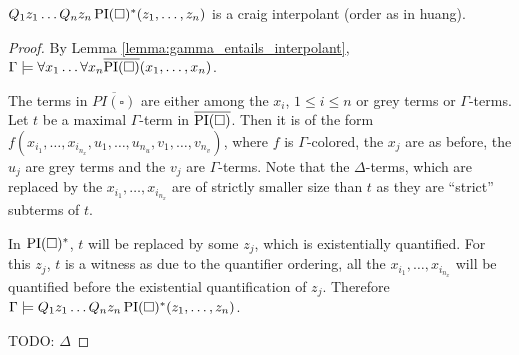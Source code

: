 \begin{thm}
	$Q_1 z_1 \ldots Q_n z_n \operatorname{PI}(\square)^*(z_1, \ldots, z_n)$ is a craig interpolant (order as in huang).
\end{thm}
\begin{proof}
	By Lemma \ref{lemma:gamma_entails_interpolant}, $\Gamma \models \forall x_1 \ldots \forall x_n \overline{\operatorname{PI}(\square)}(x_1, \ldots, x_n)$.

	The terms in $\overline{PI(\square)}$ are either among the $x_i$, $1 \leq i \leq n$ or grey terms or $\Gamma$-terms.
	Let $t$ be a maximal $\Gamma$-term in $\overline{\operatorname{PI}(\square)}$.
	Then it is of the form $f(x_{i_1}, \ldots, x_{i_{n_x}}, u_1, \ldots, u_{n_u}, v_1, \ldots, v_{n_v})$, where $f$ is $\Gamma$-colored, the $x_j$ are as before, the $u_j$ are grey terms and the $v_j$ are $\Gamma$-terms.
	Note that the $\Delta$-terms, which are replaced by the $x_{i_1}, \ldots, x_{i_{n_x}}$ are of strictly smaller size than $t$ as they are ``strict'' subterms of $t$.

	In $\operatorname{PI}(\square)^*$, $t$ will be replaced by some $z_j$, which is existentially quantified.
	For this $z_j$, $t$ is a witness as due to the quantifier ordering, all the $x_{i_1}, \ldots, x_{i_{n_x}}$ will be quantified before the existential quantification of $z_j$.
	Therefore $\Gamma \models Q_1 z_1 \ldots Q_n z_n \operatorname{PI}(\square)^*(z_1, \ldots, z_n)$.

	TODO: $\Delta$
\end{proof}



